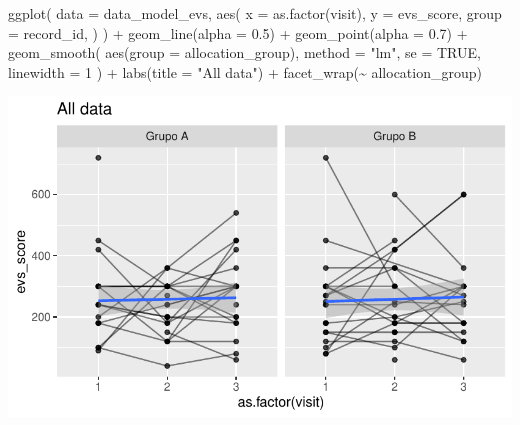 \documentclass[
  12pt,
]{article}
\newenvironment{Shaded}{\begin{snugshade}}{\end{snugshade}}
\newcommand{\AttributeTok}[1]{\textcolor[rgb]{0.40,0.45,0.13}{#1}}
\newcommand{\ConstantTok}[1]{\textcolor[rgb]{0.56,0.35,0.01}{#1}}
\newcommand{\DecValTok}[1]{\textcolor[rgb]{0.68,0.00,0.00}{#1}}
\newcommand{\FloatTok}[1]{\textcolor[rgb]{0.68,0.00,0.00}{#1}}
\newcommand{\FunctionTok}[1]{\textcolor[rgb]{0.28,0.35,0.67}{#1}}
\newcommand{\NormalTok}[1]{\textcolor[rgb]{0.00,0.23,0.31}{#1}}
\newcommand{\SpecialCharTok}[1]{\textcolor[rgb]{0.37,0.37,0.37}{#1}}
\newcommand{\StringTok}[1]{\textcolor[rgb]{0.13,0.47,0.30}{#1}}
\begin{document}
\begin{Shaded}
\begin{Highlighting}[]
\FunctionTok{ggplot}\NormalTok{(}
    \AttributeTok{data =}\NormalTok{ data\_model\_evs, }
    \FunctionTok{aes}\NormalTok{(}
        \AttributeTok{x =} \FunctionTok{as.factor}\NormalTok{(visit),}
        \AttributeTok{y =}\NormalTok{ evs\_score,}
        \AttributeTok{group =}\NormalTok{ record\_id,}
\NormalTok{    )}
\NormalTok{) }\SpecialCharTok{+}
    \FunctionTok{geom\_line}\NormalTok{(}\AttributeTok{alpha =} \FloatTok{0.5}\NormalTok{) }\SpecialCharTok{+}
    \FunctionTok{geom\_point}\NormalTok{(}\AttributeTok{alpha =} \FloatTok{0.7}\NormalTok{) }\SpecialCharTok{+}
    \FunctionTok{geom\_smooth}\NormalTok{(}
        \FunctionTok{aes}\NormalTok{(}\AttributeTok{group =}\NormalTok{ allocation\_group),}
        \AttributeTok{method =} \StringTok{"lm"}\NormalTok{,}
        \AttributeTok{se =} \ConstantTok{TRUE}\NormalTok{,}
        \AttributeTok{linewidth =} \DecValTok{1}
\NormalTok{    ) }\SpecialCharTok{+}
    \FunctionTok{labs}\NormalTok{(}\AttributeTok{title =} \StringTok{"All data"}\NormalTok{) }\SpecialCharTok{+}
    \FunctionTok{facet\_wrap}\NormalTok{(}\SpecialCharTok{\textasciitilde{}}\NormalTok{ allocation\_group) }
\end{Highlighting}
\end{Shaded}

\includegraphics{Outcomes_files/figure-pdf/evs_score_6-1.pdf}
\end{document}
